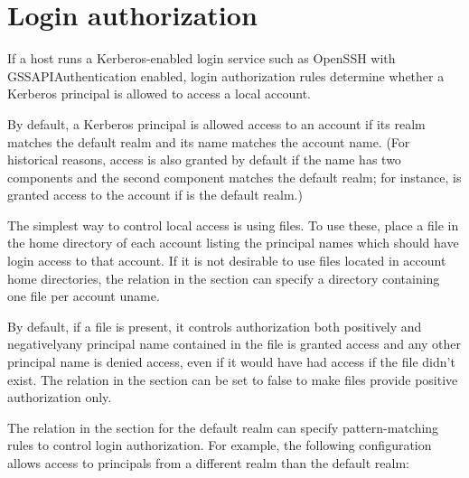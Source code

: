 \documentclass[letterpaper,10pt,english]{sphinxmanual}
\begin{document}
\section{Login authorization}
\label{\detokenize{admin/host_config:login-authorization}}\label{\detokenize{admin/host_config:id1}}
If a host runs a Kerberos-enabled login service such as OpenSSH with
GSSAPIAuthentication enabled, login authorization rules determine
whether a Kerberos principal is allowed to access a local account.

By default, a Kerberos principal is allowed access to an account if
its realm matches the default realm and its name matches the account
name.  (For historical reasons, access is also granted by default if
the name has two components and the second component matches the
default realm; for instance, 
is granted access to the  account if  is
the default realm.)

The simplest way to control local access is using 
files.  To use these, place a  file in the home directory
of each account listing the principal names which should have login
access to that account.  If it is not desirable to use 
files located in account home directories, the 
relation in the {\hyperref[\detokenize{admin/conf_files/krb5_conf:libdefaults}]{}} section can specify a directory
containing one file per account uname.

By default, if a  file is present, it controls
authorization both positively and negatively\textendash{}any principal name
contained in the file is granted access and any other principal name
is denied access, even if it would have had access if the 
file didn’t exist.  The  relation in the
{\hyperref[\detokenize{admin/conf_files/krb5_conf:libdefaults}]{}} section can be set to false to make 
files provide positive authorization only.

The  relation in the {\hyperref[\detokenize{admin/conf_files/krb5_conf:realms}]{}} section for the
default realm can specify pattern-matching rules to control login
authorization.  For example, the following configuration allows access
to principals from a different realm than the default realm:
\end{document}
